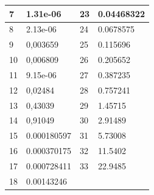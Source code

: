 \documentclass[11pt,openany]{book}
\begin{document}
\begin{figure}[H]
\begin{minipage}{0.5\textwidth}
\begin{tabular}{|l|l|l|l|}
            7               & 1.31e-06        & 23              & 0.04468322      \\ \hline
            8               & 2.13e-06        & 24              & 0.0678575       \\ \hline
            9               & 0,003659        & 25              & 0.115696        \\ \hline
            10              & 0,006809        & 26              & 0.205652        \\ \hline
            11              & 9.15e-06        & 27              & 0.387235        \\ \hline
            12              & 0,02484         & 28              & 0.757241        \\ \hline
            13              & 0,43039         & 29              & 1.45715         \\ \hline
            14              & 0,91049         & 30              & 2.91489         \\ \hline
            15              & 0.000180597     & 31              & 5.73008         \\ \hline
            16              & 0.000370175     & 32              & 11.5402         \\ \hline
            17              & 0.000728411     & 33              & 22.9485         \\ \hline
            18              & 0.00143246      & ~               &                 \\ \hline
        \end{tabular}
    \end{minipage}
\end{figure}
\end{document}
